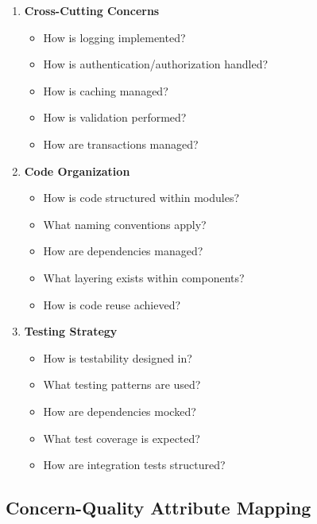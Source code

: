 \documentclass[11pt,letterpaper]{article}
\begin{document}
\begin{enumerate}[label=\textbf{C\arabic*:}, leftmargin=2.5em]
    \item \textbf{Cross-Cutting Concerns}
    \begin{itemize}[nosep]
        \item How is logging implemented?
        \item How is authentication/authorization handled?
        \item How is caching managed?
        \item How is validation performed?
        \item How are transactions managed?
    \end{itemize}
    
    \item \textbf{Code Organization}
    \begin{itemize}[nosep]
        \item How is code structured within modules?
        \item What naming conventions apply?
        \item How are dependencies managed?
        \item What layering exists within components?
        \item How is code reuse achieved?
    \end{itemize}
    
    \item \textbf{Testing Strategy}
    \begin{itemize}[nosep]
        \item How is testability designed in?
        \item What testing patterns are used?
        \item How are dependencies mocked?
        \item What test coverage is expected?
        \item How are integration tests structured?
    \end{itemize}
\end{enumerate}

\subsection{Concern-Quality Attribute Mapping}
\end{document}
